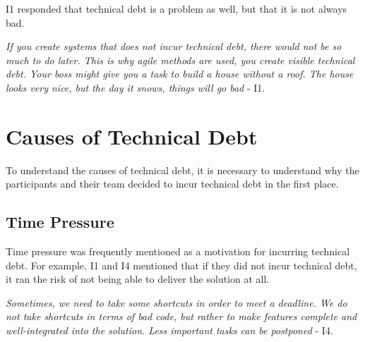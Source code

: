 I1 responded that technical debt is a problem as well, but that it is not always bad. 
\begin{displayquote}
\textit{If you create systems that does not incur technical debt, there would not be so much to do later. This is why agile methods are used, you create visible technical debt. Your boss might give you a task to build a house without a roof. The house looks very nice, but the day it snows, things will go bad} - I1.
\end{displayquote}











\section{Causes of Technical Debt}
\label{sec:techCause}
To understand the causes of technical debt, it is necessary to understand why the participants and their team decided to incur technical debt in the first place. 

\subsection{Time Pressure}
Time pressure was frequently mentioned as a motivation for incurring technical debt. For example, I1 and I4 mentioned that if they did not incur technical debt, it ran the risk of not being able to deliver the solution at all. 

\begin{displayquote}
\textit{Sometimes, we need to take some shortcuts in order to meet a deadline. We do not take shortcuts in terms of bad code, but rather to make features complete and well-integrated into the solution. Less important tasks can be postponed} - I4.
\end{displayquote}

